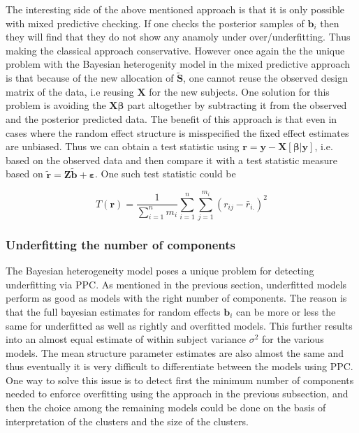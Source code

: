 The interesting side of the above mentioned approach is that it is only possible with mixed predictive checking. If one checks the posterior samples of $\boldsymbol{b}_i$ then they will find that they do not show any anamoly under over/underfitting. Thus making the classical approach conservative. However once again the the unique problem with the Bayesian heterogenity model in the mixed predictive approach is that because of the new allocation of $\boldsymbol{\tilde{S}}$, one cannot reuse the observed design matrix of the data, i.e reusing $\boldsymbol{X}$ for the new subjects. One solution for this problem is avoiding the $\boldsymbol{X\beta}$ part altogether by subtracting it from the observed and the posterior predicted data. The benefit of this approach is that even in cases where the random effect structure is misspecified the fixed effect estimates are unbiased. Thus we can obtain a test statistic using $\boldsymbol{r} = \boldsymbol{y} - \boldsymbol{X}[\boldsymbol{\beta}|\boldsymbol{y}]$, i.e. based on the observed data and then compare it with a test statistic measure based on $\boldsymbol{\tilde{r}}=\boldsymbol{Z\tilde{b}} + \boldsymbol{\varepsilon}$. One such test statistic could be

\begin{equation}
\label{eq : ppc_test_statistic}
T(\boldsymbol{r}) = \frac 1 {\sum_{i=1}^n m_i} \sum_{i=1}^n \sum_{j=1}^{m_i} {(r_{ij}-\bar{r}_{i.})}^2
\end{equation}

\subsubsection{Underfitting the number of components}
The Bayesian heterogeneity model poses a unique problem for detecting underfitting via PPC. As mentioned in the previous section, underfitted models perform as good as models with the right number of components. The reason is that the full bayesian estimates for random effects $\boldsymbol{b}_i$ can be more or less the same for underfitted as well as rightly and overfitted models. This further results into an almost equal estimate of within subject variance $\sigma^2$ for the various models. The mean structure parameter estimates are also almost the same and thus eventually it is very difficult to differentiate between the models using PPC. One way to solve this issue is to detect first the minimum number of components needed to enforce overfitting using the approach in the previous subsection, and then the choice among the remaining models could be done on the basis of interpretation of the clusters and the size of the clusters.
 
